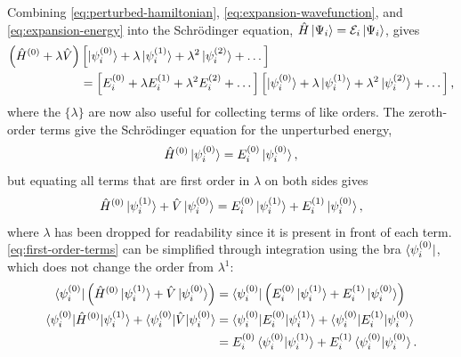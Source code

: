 \documentclass[%
class = book,%
crop = false,%
float = true,%
multi = true,%
preview = false,%
]{standalone}
\begin{document}
Combining \eqref{eq:perturbed-hamiltonian}, \eqref{eq:expansion-wavefunction}, and \eqref{eq:expansion-energy} into the Schr{\"{o}}dinger equation, \(\hat{H}\ket{\Psi_{i}} = \mathcal{E}_{i}\ket{\Psi_{i}}\), gives
\begin{equation}
  \label{eq:expansion-schrodinger}
  \begin{aligned}
    \left( \hat{H}^{(0)} + \lambda\hat{V} \right) &\left[ \ket{\psi_{i}^{(0)}} + \lambda\ket{\psi_{i}^{(1)}} + \lambda^{2}\ket{\psi_{i}^{(2)}} + \dots \right] \\
    &= \left[ E_{i}^{(0)} + \lambda E_{i}^{(1)} + \lambda^{2} E_{i}^{(2)} + \dots \right] \left[ \ket{\psi_{i}^{(0)}} + \lambda\ket{\psi_{i}^{(1)}} + \lambda^{2}\ket{\psi_{i}^{(2)}} + \dots \right],
  \end{aligned}
\end{equation}
where the \(\{\lambda\}\) are now also useful for collecting terms of like orders. The zeroth-order terms give the Schr{\"{o}}dinger equation for the unperturbed energy,
\begin{equation}
  \label{eq:unperturbed-energy}
  \hat{H}^{(0)} \ket{\psi_{i}^{(0)}} = E_{i}^{(0)} \ket{\psi_{i}^{(0)}},
\end{equation}
but equating all terms that are first order in \(\lambda\) on both sides gives
\begin{equation}
  \label{eq:first-order-terms}
  \hat{H}^{(0)} \ket{\psi_{i}^{(1)}} + \hat{V} \ket{\psi_{i}^{(0)}} = E_{i}^{(0)} \ket{\psi_{i}^{(1)}} + E_{i}^{(1)} \ket{\psi_{i}^{(0)}},
\end{equation}
where \(\lambda\) has been dropped for readability since it is present in front of each term. \eqref{eq:first-order-terms} can be simplified through integration using the bra \(\bra{\psi_{i}^{(0)}}\), which does not change the order from \(\lambda^{1}\):
\begin{equation}
  \label{eq:first-order-terms-bra}
  \begin{aligned}
    \bra{\psi_{i}^{(0)}} \left( \hat{H}^{(0)} \ket{\psi_{i}^{(1)}} + \hat{V} \ket{\psi_{i}^{(0)}} \right) &= \bra{\psi_{i}^{(0)}} \left( E_{i}^{(0)} \ket{\psi_{i}^{(1)}} + E_{i}^{(1)} \ket{\psi_{i}^{(0)}} \right) \\
    \braket{\psi_{i}^{(0)} | \hat{H}^{(0)} | \psi_{i}^{(1)}} + \braket{\psi_{i}^{(0)} | \hat{V} | \psi_{i}^{(0)}} &= \braket{\psi_{i}^{(0)} | E_{i}^{(0)} | \psi_{i}^{(1)}} + \braket{\psi_{i}^{(0)} | E_{i}^{(1)} | \psi_{i}^{(0)}} \\
    &= E_{i}^{(0)} \braket{\psi_{i}^{(0)} | \psi_{i}^{(1)}} + E_{i}^{(1)} \braket{\psi_{i}^{(0)} | \psi_{i}^{(0)}}.
  \end{aligned}
\end{equation}
\end{document}
